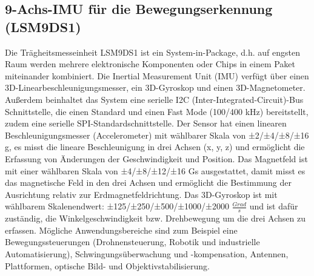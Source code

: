 \subsection{9-Achs-IMU für die Bewegungserkennung (LSM9DS1)}
	Die Trägheitsmesseinheit LSM9DS1 ist ein System-in-Package, d.h. auf engsten Raum werden mehrere elektronische Komponenten oder Chips in einem Paket miteinander kombiniert.\cite{Lienig.2012} Die Inertial Measurement Unit (IMU) verfügt über einen 3D-Linearbeschleunigungsmesser, ein 3D-Gyroskop und einen 3D-Magnetometer. Außerdem beinhaltet das System eine serielle I2C (Inter-Integrated-Circuit)-Bus Schnittstelle, die einen Standard und einen Fast Mode (100/400 kHz) bereitstellt, zudem eine serielle SPI-Standardschnittstelle. Der Sensor hat einen linearen Beschleunigungsmesser (Accelerometer) mit wählbarer Skala von ±2/±4/±8/±16 g, es misst die lineare Beschleunigung in drei Achsen (x, y, z) und ermöglicht die Erfassung von Änderungen der Geschwindigkeit und Position. Das Magnetfeld ist mit einer wählbaren Skala von ±4/±8/±12/±16 Gs ausgestattet, damit misst es das magnetische Feld in den drei Achsen und ermöglicht die Bestimmung der Ausrichtung relativ zur Erdmagnetfeldrichtung. Das 3D-Gyroskop ist mit wählbarem Skalenendwert: ±125/±250/±500/±1000/±2000 $\frac{Grad}{s}$ und ist dafür zuständig, die Winkelgeschwindigkeit bzw. Drehbewegung um die drei Achsen zu erfassen.\cite{STM1.2015}\cite{Ard.2024}
Mögliche Anwendungsbereiche sind zum Beispiel eine Bewegungssteuerungen (Drohnensteuerung, Robotik und industrielle Automatisierung), Schwingungsüberwachung und -kompensation, Antennen, Plattformen, optische Bild- und Objektivstabilisierung.  

